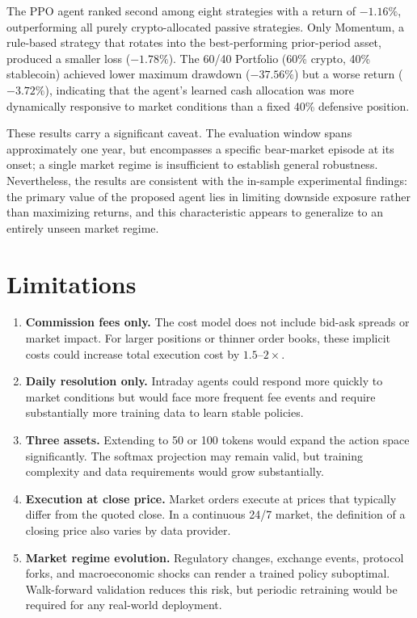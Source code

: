 \documentclass[pdflatex,sn-mathphys-num]{sn-jnl}
\begin{document}
The PPO agent ranked second among eight strategies with a return of $-1.16\%$,
outperforming all purely crypto-allocated passive strategies. Only Momentum, a
rule-based strategy that rotates into the best-performing prior-period asset,
produced a smaller loss ($-1.78\%$). The 60/40 Portfolio (60\% crypto,
40\% stablecoin) achieved lower maximum drawdown ($-37.56\%$) but a worse
return ($-3.72\%$), indicating that the agent's learned cash allocation was
more dynamically responsive to market conditions than a fixed 40\% defensive
position.

These results carry a significant caveat. The evaluation window spans
approximately one year, but encompasses a specific bear-market episode at its
onset; a single market regime is insufficient to establish general robustness. Nevertheless, the results are consistent with the in-sample
experimental findings: the primary value of the proposed agent lies in limiting
downside exposure rather than maximizing returns, and this characteristic
appears to generalize to an entirely unseen market regime.

\section{Limitations}\label{sec:limitations}

\begin{enumerate}[leftmargin=*]
\item \textbf{Commission fees only.} The cost model does not include bid-ask spreads or market impact. For larger positions or thinner order books, these implicit costs could increase total execution cost by $1.5\text{--}2\times$.
\item \textbf{Daily resolution only.} Intraday agents could respond more quickly to market conditions but would face more frequent fee events and require substantially more training data to learn stable policies.
\item \textbf{Three assets.} Extending to 50 or 100 tokens would expand the action space significantly. The softmax projection may remain valid, but training complexity and data requirements would grow substantially.
\item \textbf{Execution at close price.} Market orders execute at prices that typically differ from the quoted close. In a continuous 24/7 market, the definition of a closing price also varies by data provider.
\item \textbf{Market regime evolution.} Regulatory changes, exchange events, protocol forks, and macroeconomic shocks can render a trained policy suboptimal. Walk-forward validation reduces this risk, but periodic retraining would be required for any real-world deployment.
\end{enumerate}
\end{document}
